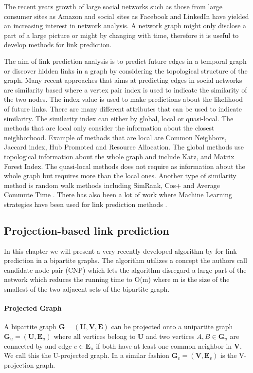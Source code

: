 The recent years growth of large social networks such as those from large consumer sites as Amazon and social sites as Facebook and LinkedIn have yielded an increasing interest in network analysis. A network graph might only disclose a part of a large picture or might by changing with time, therefore it is useful to develop methods for link prediction.

The aim of link prediction analysis is to predict future edges in a temporal graph or discover hidden links in a graph by considering the topological structure of the graph. Many recent approaches that aims at predicting edges in social networks are similarity based where a vertex pair index is used to indicate the similarity of the two nodes. The index value is used to make predictions about the likelihood of future links. There are many different attributes that can be used to indicate similarity. The similarity index can either by global, local or quasi-local. The methods that are local only consider the information about the closest neighborhood. Example of methods that are local are Common Neighbors, Jaccard index, Hub Promoted and Resource Allocation\cite{linkpredict}. The global methods use topological information about the whole graph and include Katz, and Matrix Forest Index\cite{linkpredict}. The quasi-local methods does not require as information about the whole graph but requires more than the local ones. Another type of similarity method is random walk methods including SimRank, Cos+ and Average Commute Time \cite{linkpredict}. There has also been a lot of work where Machine Learning strategies have been used for link prediction methods \cite{mlpredict1,mlpredict2,mlpredict3,mlpredict4,mlpredict5,mlpredict6,mlpredict7}.

\subsection{Projection-based link prediction}
In this chapter we will present a very recently developed algorithm by \citet{plp} for link prediction in a bipartite graphs. The algorithm utilizes a concept the authors call candidate node pair (CNP) which lets the algorithm disregard a large part of the network which reduces the running time to O(m) where m is the size of the smallest of the two adjacent sets of the bipartite graph.

\paragraph{Projected Graph}
A bipartite graph $\textbf{G} = (\textbf{U},\textbf{V},\textbf{E})$ can be projected onto a unipartite graph $\textbf{G}_u = (\textbf{U},\textbf{E}_u)$ where all vertices belong to $\textbf{U}$ and two vertices $A,B\in\textbf{G}_u$ are connected by and edge $e\in\textbf{E}_u$ if both have at least one common neighbor in $\textbf{V}$. We call this the U-projected graph. In a similar fashion $\textbf{G}_v = (\textbf{V},\textbf{E}_v)$ is the V-projection graph.

